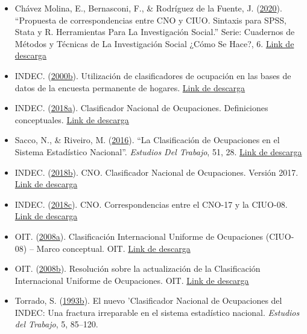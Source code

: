 \documentclass[
]{article}
\begin{document}
\begin{itemize}
\item
  Chávez Molina, E., Bernasconi, F., \& Rodríguez de la Fuente, J. (\protect\hyperlink{ref-ChavezMolina.etal2020}{2020}). ``Propuesta de correspondencias entre CNO y CIUO. Sintaxis para SPSS, Stata y R. Herramientas Para La Investigación Social.'' Serie: Cuadernos de Métodos y Técnicas de La Investigación Social ¿Cómo Se Hace?, 6. \href{http://iigg.sociales.uba.ar/2020/09/30/his-6-propuesta-de-correspondencias-entre-cno-y-ciuo-sintaxis-para-spss-stata-y-r/?fbclid=IwAR3RvLDs7H8wYHDqUooZMEI74HIDS6MXT3YbEjstG44yt0DB9tFj0VwlT9A}{Link de descarga}
\item
  INDEC. (\protect\hyperlink{ref-INDEC2000a}{2000b}). Utilización de clasificadores de ocupación en las bases de datos de la encuesta permanente de hogares. \href{https://www.indec.gob.ar/dbindec/EPH_Clasif_Ocup_hasta_CNO_2001.doc}{Link de descarga}
\item
  INDEC. (\protect\hyperlink{ref-INDEC2018}{2018a}). Clasificador Nacional de Ocupaciones. Definiciones conceptuales. \href{https://www.indec.gob.ar/ftp/cuadros/menusuperior/clasificadores/definiciones_conceptuales_cno.pdf}{Link de descarga}
\item
  Sacco, N., \& Riveiro, M. (\protect\hyperlink{ref-Sacco2016b}{2016}). ``La Clasificación de Ocupaciones en el Sistema Estadístico Nacional''. \emph{Estudios Del Trabajo}, 51, 28. \href{https://aset.org.ar/ojs/revista/article/view/24}{Link de descarga}
\item
  INDEC. (\protect\hyperlink{ref-INDEC2018a}{2018b}). CNO. Clasificador Nacional de Ocupaciones. Versión 2017. \href{https://www.indec.gob.ar/ftp/cuadros/menusuperior/clasificadores/CNO_2017.pdf}{Link de descarga}
\item
  INDEC. (\protect\hyperlink{ref-INDEC2018b}{2018c}). CNO. Correspondencias entre el CNO-17 y la CIUO-08. \href{https://www.indec.gob.ar/ftp/cuadros/menusuperior/clasificadores/correspondencias_cno2017_ciuo2008.pdf}{Link de descarga}
\item
  OIT. (\protect\hyperlink{ref-OIT2008}{2008a}). Clasificación Internacional Uniforme de Ocupaciones (CIUO-08) -- Marco conceptual. OIT. \href{https://www.ilo.org/public/spanish/bureau/stat/isco/docs/annex1.pdf}{Link de descarga}
\item
  OIT. (\protect\hyperlink{ref-OIT2008a}{2008b}). Resolución sobre la actualización de la Clasificación Internacional Uniforme
  de Ocupaciones. OIT. \href{https://www.ilo.org/public/spanish/bureau/stat/isco/docs/resol08.pdf}{Link de descarga}
\item
  Torrado, S. (\protect\hyperlink{ref-Torrado1993a}{1993b}). El nuevo 'Clasificador Nacional de Ocupaciones del INDEC: Una fractura irreparable en el sistema estadístico nacional. \emph{Estudios del Trabajo}, 5, 85--120.
\end{itemize}
\end{document}
